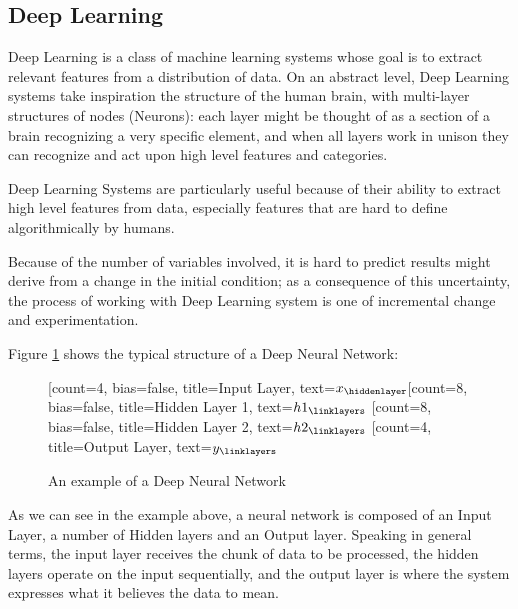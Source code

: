 \subsection{Deep Learning}\label{subsec:deep-learning}
Deep Learning is a class of machine learning systems whose goal is to extract relevant features from a distribution of data. On an abstract level, Deep Learning systems take inspiration the structure of the human brain, with multi-layer structures of nodes (Neurons): each layer might be thought of as a section of a brain recognizing a very specific element, and when all layers work in unison they can recognize and act upon high level features and categories.


Deep Learning Systems are particularly useful because of their ability to extract high level features from data, especially features that are hard to define algorithmically by humans.

Because of the number of variables involved, it is hard to predict results might derive from a change in the initial condition; as a consequence of this uncertainty, the process of working with Deep Learning system is one of incremental change and experimentation. 

Figure \ref{fig:DNN} shows the typical structure of a Deep Neural Network:
\begin{figure}[H]
\centering    
\begin{neuralnetwork}[height=8]
\newcommand{\x}[2]{$x_#2$}
\newcommand{\y}[2]{$y_#2$}
\newcommand{\hfirst}[2]{\small $h1_#2$}
\newcommand{\hsecond}[2]{\small $h2_#2$}
[count=4, bias=false, title=Input Layer, text=\x]
\hiddenlayer[count=8, bias=false, title=Hidden Layer 1, text=\hfirst] \linklayers
\hiddenlayer[count=8, bias=false, title=Hidden Layer 2, text=\hsecond] \linklayers
\outputlayer[count=4, title=Output Layer, text=\y] \linklayers
\end{neuralnetwork}
\caption{An example of a Deep Neural Network}\label{fig:DNN}
\end{figure}
As we can see in the example above, a neural network is composed of an Input Layer, a number of Hidden layers and an Output layer.
Speaking in general terms, the input layer receives the chunk of data to be processed, the hidden layers operate on the input sequentially, and the output layer is where the system expresses what it believes the data to mean.

